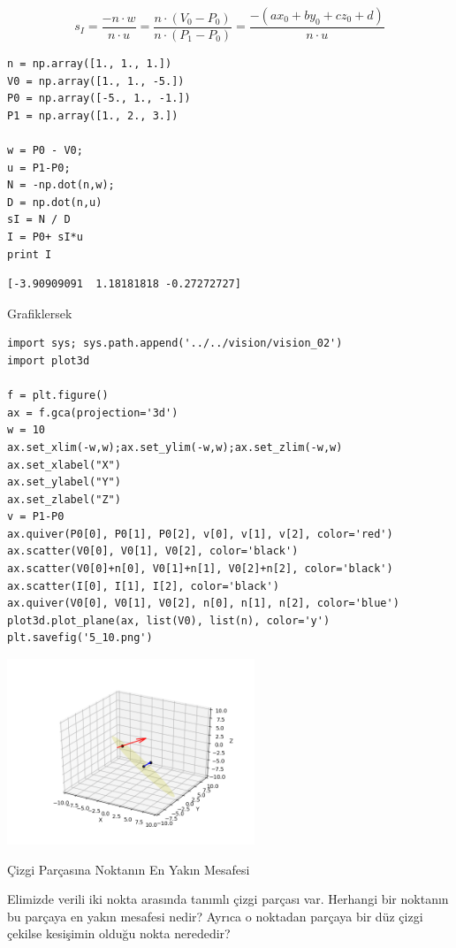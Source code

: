 \documentclass[12pt,fleqn]{article}\usepackage{../../common}
\begin{document}
$$ s_I = \frac{-n \cdot w}{n \cdot u} = 
\frac{n \cdot (V_0 - P_0)}{n \cdot (P_1-P_0)} = 
\frac{-(ax_0 + by_0 + cz_0 + d)}{n \cdot u}
$$

\begin{verbatim}
n = np.array([1., 1., 1.])
V0 = np.array([1., 1., -5.])
P0 = np.array([-5., 1., -1.])
P1 = np.array([1., 2., 3.])

w = P0 - V0;
u = P1-P0;
N = -np.dot(n,w);
D = np.dot(n,u)
sI = N / D
I = P0+ sI*u
print I
\end{verbatim}

\begin{verbatim}
[-3.90909091  1.18181818 -0.27272727]
\end{verbatim}

Grafiklersek

\begin{verbatim}
import sys; sys.path.append('../../vision/vision_02')
import plot3d

f = plt.figure()
ax = f.gca(projection='3d')
w = 10
ax.set_xlim(-w,w);ax.set_ylim(-w,w);ax.set_zlim(-w,w)
ax.set_xlabel("X")
ax.set_ylabel("Y")
ax.set_zlabel("Z")
v = P1-P0
ax.quiver(P0[0], P0[1], P0[2], v[0], v[1], v[2], color='red')
ax.scatter(V0[0], V0[1], V0[2], color='black')
ax.scatter(V0[0]+n[0], V0[1]+n[1], V0[2]+n[2], color='black')
ax.scatter(I[0], I[1], I[2], color='black')
ax.quiver(V0[0], V0[1], V0[2], n[0], n[1], n[2], color='blue')
plot3d.plot_plane(ax, list(V0), list(n), color='y')
plt.savefig('5_10.png')
\end{verbatim}

\includegraphics[width=20em]{5_10.png}

Çizgi Parçasına Noktanın En Yakın Mesafesi

Elimizde verili iki nokta arasında tanımlı çizgi parçası var. Herhangi bir
noktanın bu parçaya en yakın mesafesi nedir? Ayrıca o noktadan parçaya bir düz
çizgi çekilse kesişimin olduğu nokta nerededir?
\end{document}
